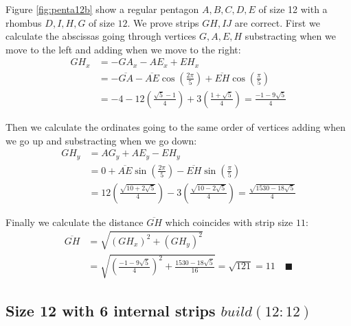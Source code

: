\documentclass[11pt]{article}
\begin{document}
Figure \ref{fig:penta12b} show a regular pentagon $A,B,C,D,E$ of size 12 with a rhombus $D,I,H,G$ of size $12$. We prove strips $GH,IJ$ are correct. First we calculate the abscissas going through vertices $G,A,E,H$ substracting when we move to the left and adding when we move to the right:
\begin{align}
GH_x &= -GA_x - AE_x + EH_x\nonumber\\
 &= -\overline{GA} - \overline{AE}\cos\left(\frac{2\pi}5\right)
 +\overline{EH}\cos\left(\frac{\pi}5\right)\nonumber\\
 &= -4 - 12\left(\frac{\sqrt5 - 1}4\right) + 3\left(\frac{1+\sqrt5}4\right)
 = \frac{-1-9\sqrt5}4
\end{align}

Then we calculate the ordinates going to the same order of vertices adding when we go up and substracting when we go down:
\begin{align}
GH_y &= AG_y + AE_y - EH_y\nonumber\\
 &= 0 + \overline{AE}\sin\left(\frac{2\pi}5\right)
 - \overline{EH}\sin\left(\frac{\pi}5\right)\nonumber\\
 &= 12\left(\frac{\sqrt{10+2\sqrt5}}4\right)
 - 3\left(\frac{\sqrt{10-2\sqrt5}}4\right)%
 = \frac{\sqrt{1530-18\sqrt5}}4
\end{align}

Finally we calculate the distance $\overline{GH}$ which coincides with strip size $11$:
\begin{align}
\overline{GH} &= \sqrt{(GH_x)^2 + (GH_y)^2}\nonumber\\
 &= \sqrt{\left(\frac{-1-9\sqrt5}{4}\right)^2 + \frac{1530-18\sqrt5}{16}}%
 = \sqrt{121} = 11 \quad\blacksquare
\end{align}

\subsection{Size 12 with 6 internal strips $build(12:12)$}
\end{document}
